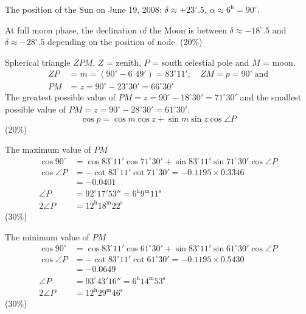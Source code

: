 The position of the Sun on June 19, 2008:
$\delta \approx +23^\circ\!.5$, $\alpha \approx 6^{\mathrm{h}} = 90^\circ$.

At full moon phase, the declination of the Moon is between
$\delta \approx -18^\circ\!.5$ and $\delta \approx -28^\circ\!.5$ depending on
the position of node. \hfill(20\%)


Spherical triangle $ZPM$, $Z$ = zenith, $P$ = south celestial pole and
$M$ = moon.
\begin{align*}
  ZP &= m = (90^\circ - 6^\circ 49') = 83^\circ 11';\quad
  ZM = p = 90^\circ\ \text{and} \\
  PM &= z = 90^\circ - 23^\circ 30' = 66^\circ 30'
\end{align*}
The greatest possible value of $PM = z = 90^\circ - 18^\circ 30' = 71^\circ 30'$
and the smallest possible value of $PM = z = 90^\circ - 28^\circ 30'
= 61^\circ 30'$.
\[
  \cos p = \cos m \cos z + \sin m \sin z \cos\angle P
\]
\hfill(20\%)

The maximum value of $PM$
\begin{align*}
  \cos 90^\circ &= \cos 83^\circ 11' \cos 71^\circ 30'
    + \sin 83^\circ 11' \sin 71^\circ 30' \cos\angle P \\
  \cos\angle P &= -\cot 83^\circ 11' \cot 71^\circ 30'
    = -0.1195 \times 0.3346 \\
  &= -0.0401 \\
  \angle P &= 92^\circ 17' 53'' = 6^{\mathrm{h}} 9^{\mathrm{m}} 11^{\mathrm{s}} \\
  2\angle P &= 12^{\mathrm{h}} 18^{\mathrm{m}} 22^{\mathrm{s}}
\end{align*}
\hfill(30\%)

The minimum value of $PM$
\begin{align*}
  \cos 90^\circ &= \cos 83^\circ 11' \cos 61^\circ 30'
    + \sin 83^\circ 11' \sin 61^\circ 30' \cos\angle P \\
  \cos\angle P &= -\cot 83^\circ 11' \cot 61^\circ 30'
    = -0.1195 \times 0.5430 \\
  &= -0.0649 \\
  \angle P &= 93^\circ 43' 16'' = 6^{\mathrm{h}} 14^{\mathrm{m}} 53^{\mathrm{s}} \\
  2\angle P &= 12^{\mathrm{h}} 29^{\mathrm{m}} 46^{\mathrm{s}}
\end{align*}
\hfill(30\%)
